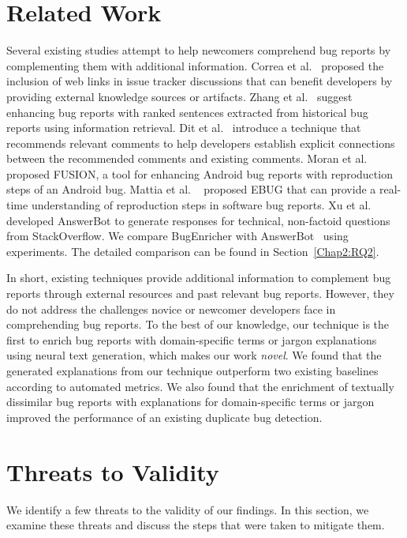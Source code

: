 \section{Related Work}\label{Chap2:RelatedWork}
Several existing studies attempt to help newcomers comprehend bug reports by complementing them with additional information. Correa et al.~\cite{correa2013samekana} proposed the inclusion of web links in issue tracker discussions that can benefit developers by providing external knowledge sources or artifacts. Zhang et al.~\cite{zhang2017bug} suggest enhancing bug reports with ranked sentences extracted from historical bug reports using information retrieval. Dit et al.~\cite{dit2008improving} introduce a technique that recommends relevant comments to help developers establish explicit connections between the recommended comments and existing comments. Moran et al.~\cite{moran2018enhancing} proposed FUSION, a tool for enhancing Android bug reports with reproduction steps of an Android bug. Mattia et al. ~\cite{fazzini2022enhancing} proposed EBUG that can provide a real-time understanding of reproduction steps in software bug reports. Xu et al.~\cite{xu2017answerbot} developed AnswerBot to generate responses for technical, non-factoid questions from StackOverflow. We compare BugEnricher with AnswerBot~\cite{xu2017answerbot} using experiments. The detailed comparison can be found in Section~\ref{Chap2:RQ2}.

In short, existing techniques provide additional information to complement bug reports through external resources and past relevant bug reports. However, they do not address the challenges novice or newcomer developers face in comprehending bug reports. To the best of our knowledge, our technique is the first to enrich bug reports with domain-specific terms or jargon explanations using neural text generation, which makes our work \textit{novel}. We found that the generated explanations from our technique outperform two existing baselines according to automated metrics. We also found that the enrichment of textually dissimilar bug reports with explanations for domain-specific terms or jargon improved the performance of an existing duplicate bug detection.

\section{Threats to Validity} \label{Chap2:Threats}
We identify a few threats to the validity of our findings. In this section, we examine these threats and discuss the steps that were taken to mitigate them.\par

